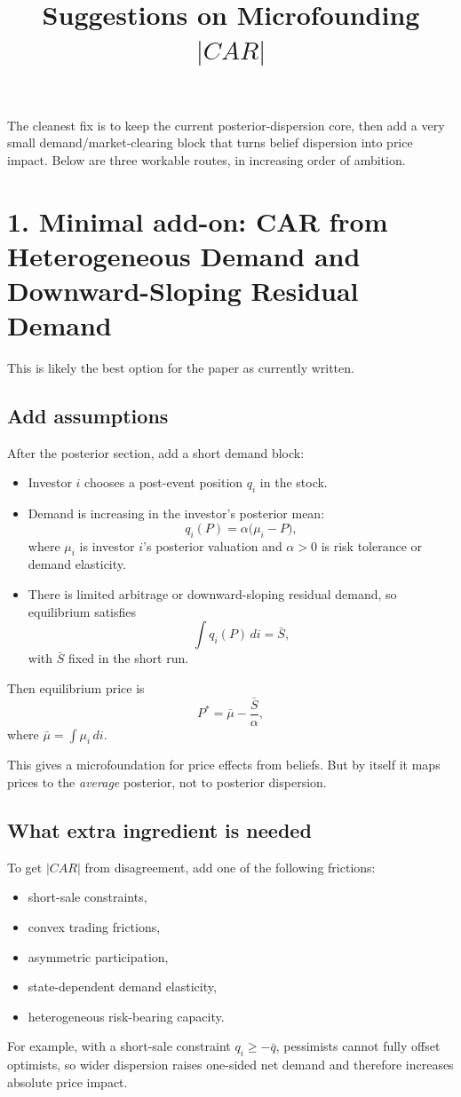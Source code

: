 \documentclass[11pt]{article}
\title{Suggestions on Microfounding $|CAR|$}
\date{}
\begin{document}
\maketitle

The cleanest fix is to keep the current posterior-dispersion core, then add a very small demand/market-clearing block that turns belief dispersion into price impact. Below are three workable routes, in increasing order of ambition.

\section*{1. Minimal add-on: CAR from Heterogeneous Demand and Downward-Sloping Residual Demand}
This is likely the best option for the paper as currently written.

\subsection*{Add assumptions}
After the posterior section, add a short demand block:
\begin{itemize}[leftmargin=1.5em]
    \item Investor $i$ chooses a post-event position $q_i$ in the stock.
    \item Demand is increasing in the investor's posterior mean:
    \[
    q_i(P)=\alpha\bigl(\mu_i-P\bigr),
    \]
    where $\mu_i$ is investor $i$'s posterior valuation and $\alpha>0$ is risk tolerance or demand elasticity.
    \item There is limited arbitrage or downward-sloping residual demand, so equilibrium satisfies
    \[
    \int q_i(P)\,di = \bar S,
    \]
    with $\bar S$ fixed in the short run.
\end{itemize}
Then equilibrium price is
\[
P^*=\bar\mu-\frac{\bar S}{\alpha},
\]
where $\bar\mu=\int \mu_i\,di$.

This gives a microfoundation for price effects from beliefs. But by itself it maps prices to the \emph{average} posterior, not to posterior dispersion.

\subsection*{What extra ingredient is needed}
To get $|CAR|$ from disagreement, add one of the following frictions:
\begin{itemize}[leftmargin=1.5em]
    \item short-sale constraints,
    \item convex trading frictions,
    \item asymmetric participation,
    \item state-dependent demand elasticity,
    \item heterogeneous risk-bearing capacity.
\end{itemize}
For example, with a short-sale constraint $q_i\geq -\bar q$, pessimists cannot fully offset optimists, so wider dispersion raises one-sided net demand and therefore increases absolute price impact.
\end{document}
